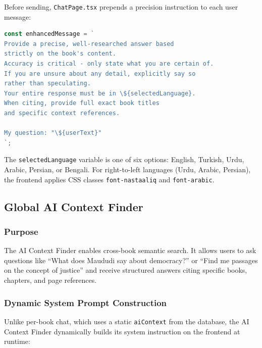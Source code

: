 \documentclass[11pt,a4paper]{article}
\begin{document}
Before sending, \texttt{ChatPage.tsx} prepends a precision instruction to each user message:

\begin{lstlisting}[language=typescript, caption=Frontend prompt enhancement]
const enhancedMessage = `
Provide a precise, well-researched answer based
strictly on the book's content.
Accuracy is critical - only state what you are certain of.
If you are unsure about any detail, explicitly say so
rather than speculating.
Your entire response must be in \${selectedLanguage}.
When citing, provide full exact book titles
and specific context references.

My question: "\${userText}"
`;
\end{lstlisting}

The \texttt{selectedLanguage} variable is one of six options: English, Turkish, Urdu, Arabic, Persian, or Bengali. For right-to-left languages (Urdu, Arabic, Persian), the frontend applies CSS classes \texttt{font-nastaaliq} and \texttt{font-arabic}.
\clearpage

\subsection{Global AI Context Finder}

\subsubsection{Purpose}

The AI Context Finder enables cross-book semantic search. It allows users to ask questions like ``What does Maududi say about democracy?'' or ``Find me passages on the concept of justice'' and receive structured answers citing specific books, chapters, and page references.

\subsubsection{Dynamic System Prompt Construction}

Unlike per-book chat, which uses a static \texttt{aiContext} from the database, the AI Context Finder dynamically builds its system instruction on the frontend at runtime:
\end{document}
